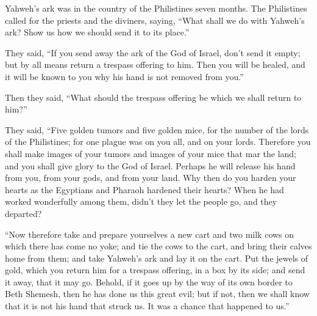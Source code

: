  Yahweh's ark was in the country of the Philistines seven
months.  The Philistines called for the priests and the
diviners, saying, ``What shall we do with Yahweh's ark? Show us how we
should send it to its place.''

 They said, ``If you send away the ark of the God of
Israel, don't send it empty; but by all means return a trespass offering
to him. Then you will be healed, and it will be known to you why his
hand is not removed from you.''

 Then they said, ``What should the trespass offering be
which we shall return to him?''

They said, ``Five golden tumors and five golden mice, for the number of
the lords of the Philistines; for one plague was on you all, and on your
lords.  Therefore you shall make images of your tumors and
images of your mice that mar the land; and you shall give glory to the
God of Israel. Perhaps he will release his hand from you, from your
gods, and from your land.  Why then do you harden your
hearts as the Egyptians and Pharaoh hardened their hearts? When he had
worked wonderfully among them, didn't they let the people go, and they
departed?

 ``Now therefore take and prepare yourselves a new cart
and two milk cows on which there has come no yoke; and tie the cows to
the cart, and bring their calves home from them;  and take
Yahweh's ark and lay it on the cart. Put the jewels of gold, which you
return him for a trespass offering, in a box by its side; and send it
away, that it may go.  Behold, if it goes up by the way of
its own border to Beth Shemesh, then he has done us this great evil; but
if not, then we shall know that it is not his hand that struck us. It
was a chance that happened to us.''

